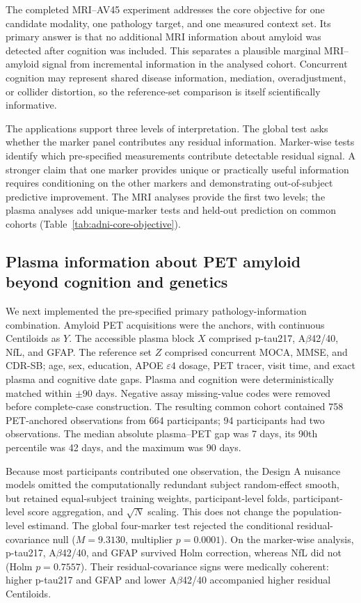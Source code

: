 \documentclass[11pt]{article}
\theoremstyle{definition}
\begin{document}
The completed MRI--AV45 experiment addresses the core objective for one candidate modality,
one pathology target, and one measured context set. Its primary answer is that no additional
MRI information about amyloid was detected after cognition was included. This separates a
plausible marginal MRI--amyloid signal from incremental information in the analysed cohort.
Concurrent cognition may represent shared disease information, mediation, overadjustment, or
collider distortion, so the reference-set comparison is itself scientifically informative.

The applications support three levels of interpretation. The global test asks
whether the marker panel contributes any residual information. Marker-wise tests identify
which pre-specified measurements contribute detectable residual signal. A stronger claim
that one marker provides unique or practically useful information requires conditioning on
the other markers and demonstrating out-of-subject predictive improvement. The MRI analyses
provide the first two levels; the plasma analyses add unique-marker tests and held-out prediction
on common cohorts (Table~\ref{tab:adni-core-objective}).

\subsection{Plasma information about PET amyloid beyond cognition and genetics}

We next implemented the pre-specified primary pathology-information combination. Amyloid PET
acquisitions were the anchors, with continuous Centiloids as $Y$. The accessible plasma block
$X$ comprised p-tau217, A$\beta$42/40, NfL, and GFAP. The reference set $Z$ comprised concurrent
MOCA, MMSE, and CDR-SB; age, sex, education, APOE $\varepsilon4$ dosage, PET tracer, visit time,
and exact plasma and cognitive date gaps. Plasma and cognition were deterministically matched
within $\pm90$ days. Negative assay missing-value codes were removed before complete-case
construction. The resulting common cohort contained 758 PET-anchored observations from 664
participants; 94 participants had two observations. The median absolute plasma--PET gap was
7 days, its 90th percentile was 42 days, and the maximum was 90 days.

Because most participants contributed one observation, the Design A nuisance models omitted
the computationally redundant subject random-effect smooth, but retained equal-subject training
weights, participant-level folds, participant-level score aggregation, and $\sqrt{N}$ scaling.
This does not change the population-level estimand. The global four-marker test rejected the
conditional residual-covariance null ($M=9.3130$, multiplier $p=0.0001$). On the marker-wise
analysis, p-tau217, A$\beta$42/40, and GFAP survived Holm correction, whereas NfL did not
(Holm $p=0.7557$). Their residual-covariance signs were medically coherent: higher p-tau217
and GFAP and lower A$\beta$42/40 accompanied higher residual Centiloids.
\end{document}
